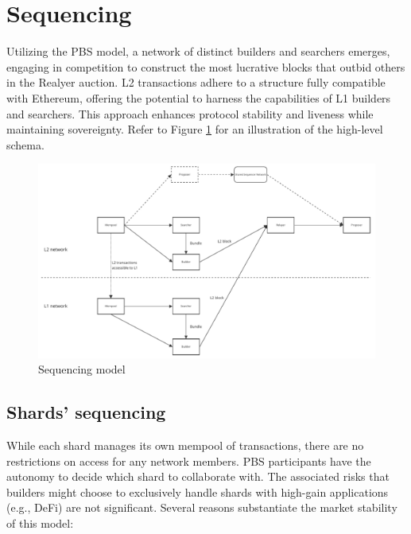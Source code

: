\section{Sequencing}
\label{section:based-sequencer}

Utilizing the PBS model, a network of distinct builders and searchers emerges, 
engaging in competition to construct the most lucrative blocks that outbid others 
in the Realyer auction. L2 transactions adhere to a structure fully compatible with 
Ethereum, offering the potential to harness the capabilities of L1 builders and searchers. 
This approach enhances protocol stability and liveness while maintaining sovereignty. Refer 
to Figure \ref{figure:on-demand-design} for an illustration of the high-level schema.

\begin{figure}
    \centering
	\includegraphics[scale=0.8]{figures/sequencer.pdf}
    \caption{Sequencing model}
     \label{figure:on-demand-design}
\end{figure}

\subsection{Shards' sequencing}


While each shard manages its own mempool of transactions, there are no restrictions on access 
for any network members. PBS participants have the autonomy to decide which shard to collaborate 
with. The associated risks that builders might choose to exclusively handle shards with high-gain 
applications (e.g., DeFi) are not significant. Several reasons substantiate the market stability 
of this model:

